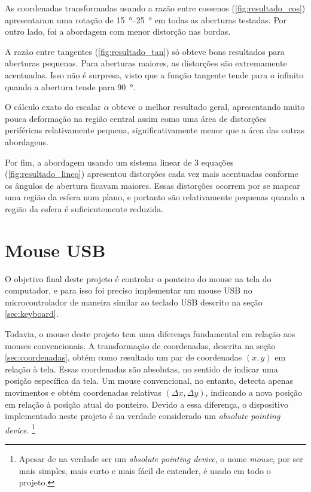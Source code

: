 \documentclass[brazil,pagestart=firstchapter]{abnt}
\begin{document}
As coordenadas transformadas usando a razão entre cossenos
(\ref{fig:resultado_cos}) apresentaram uma rotação de
\SIrange{15}{25}{\degree} em todas as aberturas testadas. Por outro lado,
foi a abordagem com menor distorção nas bordas.

A razão entre tangentes (\ref{fig:resultado_tan}) só obteve bons resultados
para aberturas pequenas. Para aberturas maiores, as distorções são
extremamente acentuadas. Isso não é surpresa, visto que a função tangente
tende para o infinito quando a abertura tende para \SI{90}{\degree}.

O cálculo exato do escalar $\alpha$ obteve o melhor resultado geral,
apresentando muito pouca deformação na região central assim como uma área de
distorções periféricas relativamente pequena, significativamente menor que a
área das outras abordagens.

Por fim, a abordagem usando um sistema linear de 3 equações
(\ref{fig:resultado_lineq}) apresentou distorções cada vez mais acentuadas
conforme os ângulos de abertura ficavam maiores. Essas distorções ocorrem
por se mapear uma região da esfera num plano, e portanto são relativamente
pequenas quando a região da esfera é suficientemente reduzida.


\section{Mouse USB} \label{sec:mouse}

O objetivo final deste projeto é controlar o ponteiro do mouse na tela do
computador, e para isso foi preciso implementar um mouse USB no
microcontrolador de maneira similar ao teclado USB descrito na seção
\ref{sec:keyboard}.

Todavia, o mouse deste projeto tem uma diferença fundamental em relação aos
mouses convencionais. A transformação de coordenadas, descrita na seção
\ref{sec:coordenadas}, obtém como resultado um par de coordenadas $(x, y)$
em relação à tela. Essas coordenadas são absolutas, no sentido de indicar
uma posição específica da tela. Um mouse convencional, no entanto, detecta
apenas movimentos e obtém coordenadas relativas $(\Delta x, \Delta y)$,
indicando a nova posição em relação à posição atual do ponteiro. Devido a
essa diferença, o dispositivo implementado neste projeto é na verdade
considerado um \textit{absolute pointing device}. \footnote{
	Apesar de na verdade ser um \textit{absolute pointing device}, o nome
	\textit{mouse}, por ser mais simples, mais curto e mais fácil de
	entender, é usado em todo o projeto.
}
\end{document}
